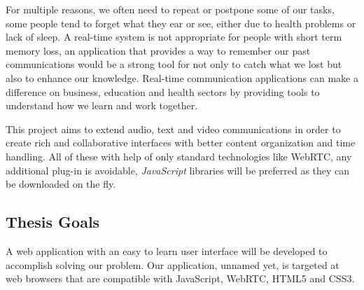 	For multiple reasons, we often need to repeat or postpone some of our tasks, some people tend to forget what they ear or see, either due to health problems or lack of sleep.
        A real-time system is not appropriate for people with short term memory loss, an application that provides a way to remember our past communications would be a strong tool for not only to catch what we lost but also to enhance our knowledge.
        Real-time communication applications can make a difference on business, education and health sectors by providing tools to understand how we learn and work together.

	This project aims to extend audio, text and video communications in order to create rich and collaborative interfaces with better content organization and time handling. All of these with help of only standard technologies like \ac{WebRTC}, any additional plug-in is avoidable, \emph{JavaScript} libraries will be preferred as they can be downloaded on the fly.  



\subsection{Thesis Goals} %

A web application with an easy to learn user interface will be developed to accomplish solving our problem. Our application, unnamed yet, is targeted at web browsers that are compatible with JavaScript, \ac{WebRTC}, \ac{HTML}5 and \ac{CSS}3.

